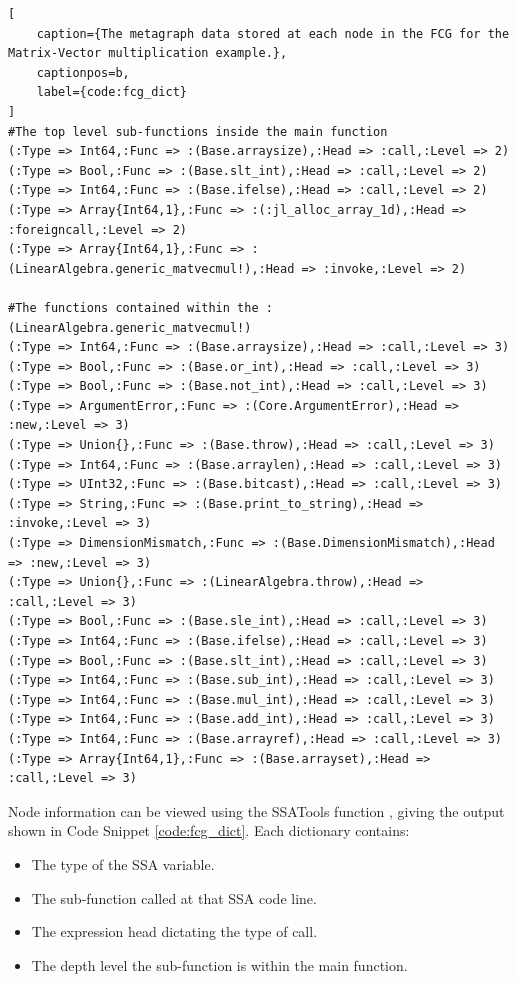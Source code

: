\pagebreak

\begin{lstlisting}[
    caption={The metagraph data stored at each node in the FCG for the Matrix-Vector multiplication example.},
    captionpos=b, 
    label={code:fcg_dict}
]
#The top level sub-functions inside the main function
(:Type => Int64,:Func => :(Base.arraysize),:Head => :call,:Level => 2)
(:Type => Bool,:Func => :(Base.slt_int),:Head => :call,:Level => 2)
(:Type => Int64,:Func => :(Base.ifelse),:Head => :call,:Level => 2)
(:Type => Array{Int64,1},:Func => :(:jl_alloc_array_1d),:Head => :foreigncall,:Level => 2)
(:Type => Array{Int64,1},:Func => :(LinearAlgebra.generic_matvecmul!),:Head => :invoke,:Level => 2)

#The functions contained within the :(LinearAlgebra.generic_matvecmul!)
(:Type => Int64,:Func => :(Base.arraysize),:Head => :call,:Level => 3)
(:Type => Bool,:Func => :(Base.or_int),:Head => :call,:Level => 3)
(:Type => Bool,:Func => :(Base.not_int),:Head => :call,:Level => 3)
(:Type => ArgumentError,:Func => :(Core.ArgumentError),:Head => :new,:Level => 3)
(:Type => Union{},:Func => :(Base.throw),:Head => :call,:Level => 3)
(:Type => Int64,:Func => :(Base.arraylen),:Head => :call,:Level => 3)
(:Type => UInt32,:Func => :(Base.bitcast),:Head => :call,:Level => 3)
(:Type => String,:Func => :(Base.print_to_string),:Head => :invoke,:Level => 3)
(:Type => DimensionMismatch,:Func => :(Base.DimensionMismatch),:Head => :new,:Level => 3)
(:Type => Union{},:Func => :(LinearAlgebra.throw),:Head => :call,:Level => 3)
(:Type => Bool,:Func => :(Base.sle_int),:Head => :call,:Level => 3)
(:Type => Int64,:Func => :(Base.ifelse),:Head => :call,:Level => 3)
(:Type => Bool,:Func => :(Base.slt_int),:Head => :call,:Level => 3)
(:Type => Int64,:Func => :(Base.sub_int),:Head => :call,:Level => 3)
(:Type => Int64,:Func => :(Base.mul_int),:Head => :call,:Level => 3)
(:Type => Int64,:Func => :(Base.add_int),:Head => :call,:Level => 3)
(:Type => Int64,:Func => :(Base.arrayref),:Head => :call,:Level => 3)
(:Type => Array{Int64,1},:Func => :(Base.arrayset),:Head => :call,:Level => 3)
\end{lstlisting}

Node information can be viewed using the SSATools function , giving the output shown in Code Snippet \ref{code:fcg_dict}. Each dictionary contains:
\begin{itemize}
\item The type of the SSA variable.
\item The sub-function called at that SSA code line.
\item The expression head dictating the type of call.
\item The depth level the sub-function is within the main function.
\end{itemize}

